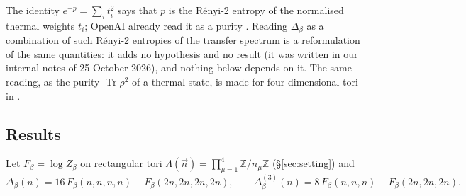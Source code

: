 \documentclass[11pt,a4paper]{article}
\theoremstyle{plain}
\theoremstyle{definition}
\theoremstyle{remark}
\numberwithin{equation}{section}
\newcommand{\Z}{\mathbb{Z}}
\newcommand{\Tr}{\operatorname{Tr}}
\begin{document}
The identity $e^{-p}=\sum_it_i^2$ says that $p$ is the R\'enyi-2 entropy of the normalised thermal weights $t_i$; OpenAI already read it as
a purity \cite[\S2]{OAI26}. Reading $\Delta_\beta$ as a combination of such R\'enyi-2 entropies of the transfer spectrum
is a reformulation of the same quantities: it adds no hypothesis and no result (it was written in our internal notes of 25 October 2026),
and nothing below depends on it. The same reading, as the purity $\Tr\rho^2$ of a thermal state, is made for four-dimensional tori in
\cite[after Proposition~7.57]{BB26v5}.

\subsection{Results}
Let $F_\beta=\log Z_\beta$ on rectangular tori $\Lambda(\vec n)=\prod_{\mu=1}^4\Z/n_\mu\Z$ (\S\ref{sec:setting}) and
\begin{equation}\label{eq:Delta}
\Delta_\beta(n)=16\,F_\beta(n,n,n,n)-F_\beta(2n,2n,2n,2n),\qquad
\Delta^{(3)}_\beta(n)=8\,F_\beta(n,n,n)-F_\beta(2n,2n,2n).
\end{equation}
\end{document}
